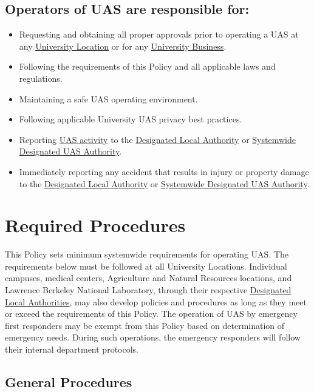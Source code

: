 \documentclass[
]{book}
\providecommand{\tightlist}{%
  \setlength{\itemsep}{0pt}\setlength{\parskip}{0pt}}
\begin{document}
\hypertarget{operators-of-uas-are-responsible-for}{%
\subsection{Operators of UAS are responsible for:}\label{operators-of-uas-are-responsible-for}}

\begin{itemize}
\tightlist
\item
  Requesting and obtaining all proper approvals prior to operating a UAS at any \protect\hyperlink{UL}{University Location} or for any \protect\hyperlink{UB}{University Business}.
\item
  Following the requirements of this Policy and all applicable laws and regulations.
\item
  Maintaining a safe UAS operating environment.
\item
  Following applicable University UAS privacy best practices.
\item
  Reporting \protect\hyperlink{UASactivity}{UAS activity} to the \protect\hyperlink{DLA}{Designated Local Authority} or \protect\hyperlink{SDA}{Systemwide Designated UAS Authority}.
\item
  Immediately reporting any accident that results in injury or property damage to the \protect\hyperlink{DLA}{Designated Local Authority} or \protect\hyperlink{SDA}{Systemwide Designated UAS Authority}.
\end{itemize}

\hypertarget{required-procedures}{%
\section{Required Procedures}\label{required-procedures}}

This Policy sets minimum systemwide requirements for operating UAS. The requirements below must be followed at all University Locations. Individual campuses, medical centers, Agriculture and Natural Resources locations, and Lawrence Berkeley National Laboratory, through their respective \protect\hyperlink{DLA}{Designated Local Authorities}, may also develop policies and procedures as long as they meet or exceed the requirements of this Policy.
The operation of UAS by emergency first responders may be exempt from this Policy based on determination of emergency needs. During such operations, the emergency responders will follow their internal department protocols.

\hypertarget{general-procedures}{%
\subsection{General Procedures}\label{general-procedures}}
\end{document}
